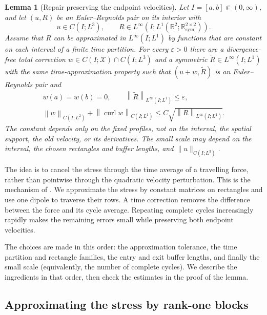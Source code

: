 \documentclass[11pt,a4paper,reqno]{amsart}
\theoremstyle{plain}
\newtheorem{lemma}[theorem]{Lemma}
\theoremstyle{definition}
\theoremstyle{remark}
\numberwithin{equation}{section}
\newcommand{\R}{\mathbb R}
\newcommand{\X}{\mathcal X}
\newcommand{\curl}{\operatorname{curl}}
\newcommand{\norm}[2]{\left\|#1\right\|_{#2}}
\begin{document}
\begin{lemma}[Repair preserving the endpoint velocities]\label{lem:repair}
Let $I=[a,b]\Subset(0,\infty)$, and let $(u,R)$ be an
Euler--Reynolds pair on its interior with
\[
 u\in C(I;L^3),\qquad
 R\in L^\infty(I;L^1(\R^2;\R^{2\times2}_{\mathrm{sym}})).
\]
Assume that $R$ can be approximated in $L^\infty(I;L^1)$ by functions
that are constant on each interval of a finite time partition.
For every $\varepsilon>0$ there are a divergence-free total correction
$w\in C(I;\X)\cap C(I;L^3)$ and a symmetric
$\widetilde R\in L^\infty(I;L^1)$ with the same time-approximation
property such that $(u+w,\widetilde R)$ is an Euler--Reynolds pair and
\begin{equation}\label{eq:repair-bounds}
 \begin{gathered}
 w(a)=w(b)=0,\qquad
 \norm{\widetilde R}{L^\infty(I;L^1)}\le\varepsilon,\\
 \norm w{C(I;L^2)}+\norm{\curl w}{C(I;L^1)}
 \le C\sqrt{\norm R{L^\infty(I;L^1)}}.
 \end{gathered}
\end{equation}
The constant depends only on the fixed profiles, not on the interval,
the spatial support, the old velocity, or its derivatives. The small
scale may depend on the interval, the chosen rectangles and buffer
lengths, and $\|u\|_{C(I;L^3)}$.
\end{lemma}

The idea is to cancel the stress through the time average of a
travelling force, rather than pointwise through the quadratic velocity
perturbation. This is the mechanism of
\cite[\S1.2.3 and \S\S4.7--4.8]{BCK}. We approximate the stress by
constant matrices on rectangles and use one dipole to traverse their
rows. A time correction removes the difference between the force and
its cycle average. Repeating complete cycles increasingly rapidly
makes the remaining errors small while preserving both endpoint
velocities.

The choices are made in this order: the approximation tolerance,
the time partition and rectangle families, the entry and exit buffer
lengths, and finally the small scale (equivalently, the number of
complete cycles). We describe the ingredients in that order, then
check the estimates in the proof of the lemma.

\subsection{Approximating the stress by rank-one blocks}
\end{document}
